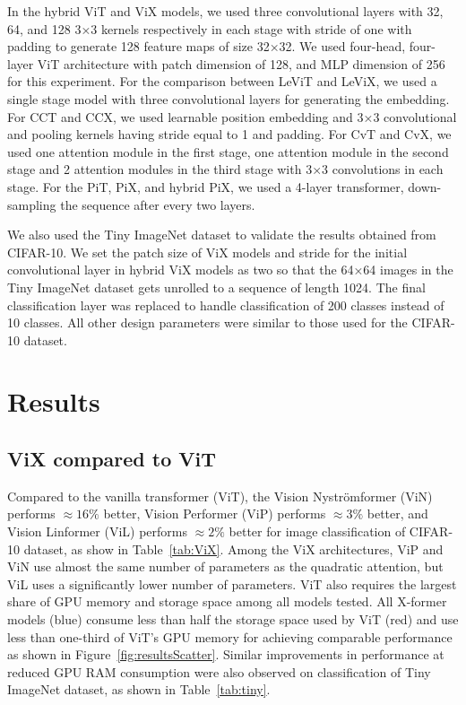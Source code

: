 \documentclass{article}
\begin{document}
In the hybrid ViT and ViX models, we used three convolutional layers with 32, 64, and 128 3×3 kernels respectively in each stage with stride of one with padding to generate 128 feature maps of size 32×32. We used four-head, four-layer ViT architecture with patch dimension of 128, and MLP dimension of 256 for this experiment. For the comparison between LeViT and LeViX, we used a single stage model with three convolutional layers for generating the embedding. For CCT and CCX, we used learnable position embedding and 3×3 convolutional and pooling kernels having stride equal to 1 and padding. For CvT and CvX, we used one attention module in the first stage, one attention module in the second stage and 2 attention modules in the third stage with 3×3 convolutions in each stage. For the PiT, PiX, and hybrid PiX, we used a 4-layer transformer, down-sampling the sequence after every two layers.

We also used the Tiny ImageNet dataset to validate the results obtained from CIFAR-10. We set the patch size of ViX models and stride for the initial convolutional layer in hybrid ViX models as two so that the 64×64 images in the Tiny ImageNet dataset gets unrolled to a sequence of length 1024. The final classification layer was replaced to handle classification of 200 classes instead of 10 classes. All other design parameters were similar to those used for the CIFAR-10 dataset.


\section{Results}


\subsection{ViX compared to ViT}


Compared to the vanilla transformer (ViT), the Vision Nyströmformer (ViN) performs $\approx 16  \%$ better, Vision Performer (ViP) performs $\approx 3 \%$ better, and Vision Linformer (ViL) performs $\approx 2 \%$ better for image classification of CIFAR-10 dataset, as show in Table~\ref{tab:ViX}. Among the ViX architectures, ViP and ViN use almost the same number of parameters as the quadratic attention, but ViL uses a significantly lower number of parameters. ViT also requires the largest share of GPU memory and storage space among all models tested. All X-former models (blue) consume less than half the storage space used by ViT (red) and use less than one-third of ViT's GPU memory for achieving comparable performance as shown in Figure~\ref{fig:resultsScatter}. Similar improvements in performance at reduced GPU RAM consumption were also observed on classification of Tiny ImageNet dataset, as shown in Table~\ref{tab:tiny}. 
\end{document}
